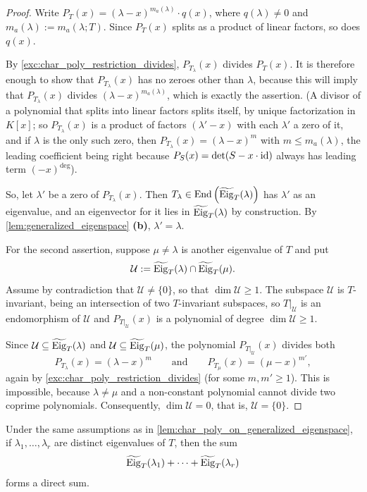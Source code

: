 \begin{proof}
Write $P_T(x) = (\lambda - x)^{m_a(\lambda)} \cdot q(x)$, where $q(\lambda) \neq 0$ and $m_a(\lambda) := m_a(\lambda; T)$. Since $P_T(x)$ splits as a product of linear factors, so does $q(x)$.

By \cref{exc:char_poly_restriction_divides}, $P_{T_\lambda}(x)$ divides $P_T(x)$. It is therefore enough to show that $P_{T_\lambda}(x)$ has no zeroes other than $\lambda$, because this will imply that $P_{T_\lambda}(x)$ divides $(\lambda - x)^{m_a(\lambda)}$, which is exactly the assertion. (A divisor of a polynomial that splits into linear factors splits itself, by unique factorization in $K[x]$; so $P_{T_\lambda}(x)$ is a product of factors $(\lambda' - x)$ with each $\lambda'$ a zero of it, and if $\lambda$ is the only such zero, then $P_{T_\lambda}(x) = (\lambda - x)^m$ with $m \le m_a(\lambda)$, the leading coefficient being right because $P_S(x) = \det(S - x \cdot \operatorname{id})$ always has leading term $(-x)^{\deg}$).

So, let $\lambda'$ be a zero of $P_{T_\lambda}(x)$. Then $T_\lambda \in \operatorname{End}\left(\widetilde{\operatorname{Eig}}_T(\lambda)\right)$ has $\lambda'$ as an eigenvalue, and an eigenvector for it lies in $\widetilde{\operatorname{Eig}}_T(\lambda)$ by construction. By \cref{lem:generalized_eigenspace} \textbf{(b)}, $\lambda' = \lambda$.

For the second assertion, suppose $\mu \neq \lambda$ is another eigenvalue of $T$ and put
\[
    \mathcal{U} := \widetilde{\operatorname{Eig}}_T(\lambda) \cap \widetilde{\operatorname{Eig}}_T(\mu).
\]
Assume by contradiction that $\mathcal{U} \neq \{0\}$, so that $\dim \mathcal{U} \ge 1$. The subspace $\mathcal{U}$ is $T$-invariant, being an intersection of two $T$-invariant subspaces, so $T|_{\mathcal{U}}$ is an endomorphism of $\mathcal{U}$ and $P_{T|_{\mathcal{U}}}(x)$ is a polynomial of degree $\dim \mathcal{U} \ge 1$.

Since $\mathcal{U} \subseteq \widetilde{\operatorname{Eig}}_T(\lambda)$ and $\mathcal{U} \subseteq \widetilde{\operatorname{Eig}}_T(\mu)$, the polynomial $P_{T|_{\mathcal{U}}}(x)$ divides both
\[
    P_{T_\lambda}(x) = (\lambda - x)^m \qquad \text{and} \qquad P_{T_\mu}(x) = (\mu - x)^{m'},
\]
again by \cref{exc:char_poly_restriction_divides} (for some $m, m' \ge 1$). This is impossible, because $\lambda \neq \mu$ and a non-constant polynomial cannot divide two coprime polynomials. Consequently, $\dim \mathcal{U} = 0$, that is, $\mathcal{U} = \{0\}$.
\end{proof}

\begin{lemma}
\label{lem:generalized_eigenspaces_direct_sum}
Under the same assumptions as in \cref{lem:char_poly_on_generalized_eigenspace}, if $\lambda_1, \dots, \lambda_r$ are distinct eigenvalues of $T$, then the sum
\[
    \widetilde{\operatorname{Eig}}_T(\lambda_1) + \dots + \widetilde{\operatorname{Eig}}_T(\lambda_r)
\]
forms a direct sum.
\end{lemma}

